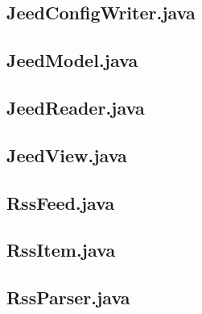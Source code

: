 \documentclass[titlepage, twoside, a4paper, 12pt]{article}
\begin{document}
\newpage
\subsection{JeedConfigWriter.java}\label{JeedConfigWriter.java}
\begin{footnotesize}
  
\end{footnotesize}

\newpage
\subsection{JeedModel.java}\label{JeedModel.java}
\begin{footnotesize}
  
\end{footnotesize}

\newpage
\subsection{JeedReader.java}\label{JeedReader.java}
\begin{footnotesize}
  
\end{footnotesize}

\newpage
\subsection{JeedView.java}\label{JeedView.java}
\begin{footnotesize}
  
\end{footnotesize}

\newpage
\subsection{RssFeed.java}\label{RssFeed.java}
\begin{footnotesize}
  
\end{footnotesize}

\newpage
\subsection{RssItem.java}\label{RssItem.java}
\begin{footnotesize}
  
\end{footnotesize}

\newpage
\subsection{RssParser.java}\label{RssParser.java}
\begin{footnotesize}
  
\end{footnotesize}
  
\end{document}

